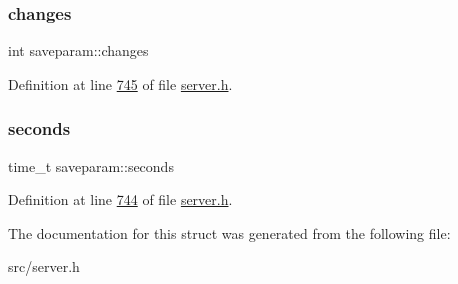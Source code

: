 \subsubsection{\texorpdfstring{changes}{changes}}
{\footnotesize\ttfamily int saveparam\+::changes}



Definition at line \hyperlink{server_8h_source_l00745}{745} of file \hyperlink{server_8h_source}{server.\+h}.

\mbox{\label{structsaveparam_af19a8ec632e45d50c08f9c4f641779c2}} 
\subsubsection{\texorpdfstring{seconds}{seconds}}
{\footnotesize\ttfamily time\+\_\+t saveparam\+::seconds}



Definition at line \hyperlink{server_8h_source_l00744}{744} of file \hyperlink{server_8h_source}{server.\+h}.



The documentation for this struct was generated from the following file\+:\begin{DoxyCompactItemize}
\item 
src/server.\+h\end{DoxyCompactItemize}
